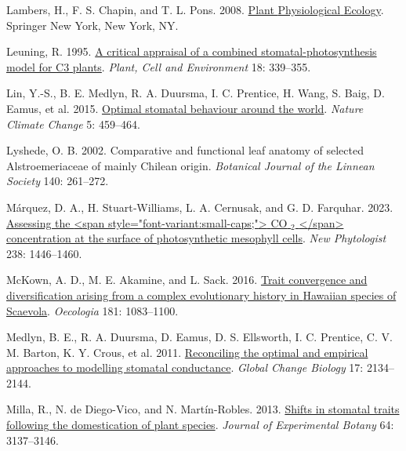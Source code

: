 \documentclass[
  letterpaper,
  DIV=11,
  numbers=noendperiod]{scrartcl}
\newlength{\cslhangindent}
\newlength{\cslentryspacingunit} %
\newenvironment{CSLReferences}[2] %
 {%
  \setlength{\parindent}{0pt}
  \ifodd #1
  \let\oldpar\par
  \def\par{\hangindent=\cslhangindent\oldpar}
  \fi
  \setlength{\parskip}{#2\cslentryspacingunit}
 }%
 {}
\begin{document}
\begin{CSLReferences}{1}{0}
\leavevmode{}%
Lambers, H., F. S. Chapin, and T. L. Pons. 2008.
\href{https://doi.org/10.1007/978-0-387-78341-3}{Plant {Physiological}
{Ecology}}. Springer New York, New York, NY.

\leavevmode{}%
Leuning, R. 1995.
\href{https://doi.org/10.1111/j.1365-3040.1995.tb00370.x}{A critical
appraisal of a combined stomatal-photosynthesis model for {C3} plants}.
\emph{Plant, Cell and Environment} 18: 339--355.

\leavevmode{}%
Lin, Y.-S., B. E. Medlyn, R. A. Duursma, I. C. Prentice, H. Wang, S.
Baig, D. Eamus, et al. 2015.
\href{https://doi.org/10.1038/nclimate2550}{Optimal stomatal behaviour
around the world}. \emph{Nature Climate Change} 5: 459--464.

\leavevmode{}%
Lyshede, O. B. 2002. Comparative and functional leaf anatomy of selected
{Alstroemeriaceae} of mainly {Chilean} origin. \emph{Botanical Journal
of the Linnean Society} 140: 261--272.

\leavevmode{}%
Márquez, D. A., H. Stuart‐Williams, L. A. Cernusak, and G. D. Farquhar.
2023. \href{https://doi.org/10.1111/nph.18784}{Assessing the
{\textless{}}span style="font-variant:small-caps;"{\textgreater{}} {CO}
\(_{\textrm{2}}\) {\textless{}}/span{\textgreater{}} concentration at
the surface of photosynthetic mesophyll cells}. \emph{New Phytologist}
238: 1446--1460.

\leavevmode{}%
McKown, A. D., M. E. Akamine, and L. Sack. 2016.
\href{https://doi.org/10.1007/s00442-016-3640-3}{Trait convergence and
diversification arising from a complex evolutionary history in
{Hawaiian} species of {Scaevola}}. \emph{Oecologia} 181: 1083--1100.

\leavevmode{}%
Medlyn, B. E., R. A. Duursma, D. Eamus, D. S. Ellsworth, I. C. Prentice,
C. V. M. Barton, K. Y. Crous, et al. 2011.
\href{https://doi.org/10.1111/j.1365-2486.2010.02375.x}{Reconciling the
optimal and empirical approaches to modelling stomatal conductance}.
\emph{Global Change Biology} 17: 2134--2144.

\leavevmode{}%
Milla, R., N. de Diego-Vico, and N. Martín-Robles. 2013.
\href{https://doi.org/10.1093/jxb/ert147}{Shifts in stomatal traits
following the domestication of plant species}. \emph{Journal of
Experimental Botany} 64: 3137--3146.


\end{CSLReferences}
\end{document}
